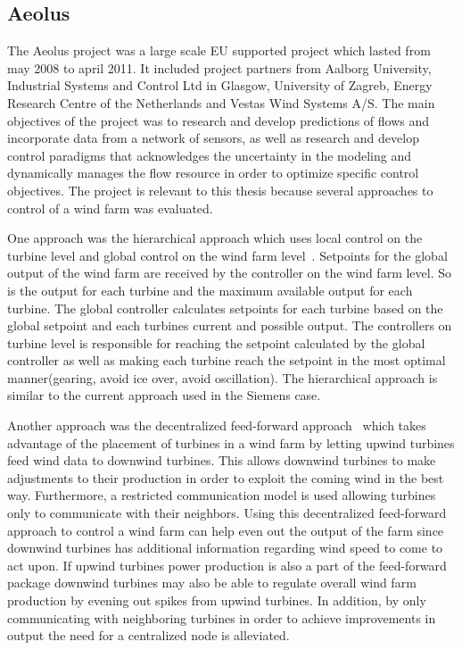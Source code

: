 \subsection{Aeolus}
The Aeolus project was a large scale EU supported project which lasted from may 2008 to april 2011. It included project partners from 
Aalborg University, Industrial Systems and Control Ltd in Glasgow, University of Zagreb, Energy Research Centre of the Netherlands and Vestas Wind Systems A/S.
The main objectives of the project was to research and develop predictions of flows and incorporate data from a network of sensors, as well as research and develop control paradigms that acknowledges the uncertainty in the modeling and dynamically manages the flow resource in order to optimize specific control objectives.
The project is relevant to this thesis because several approaches to control of a wind farm was evaluated.

One approach was the hierarchical approach which uses local control on the turbine level and global control on the wind farm level~\cite{HeirarchicalWindFarmControl}.
Setpoints for the global output of the wind farm are received by the controller on the wind farm level.
So is the output for each turbine and the maximum available output for each turbine.
The global controller calculates setpoints for each turbine based on the global setpoint and each turbines current and possible output.
The controllers on turbine level is responsible for reaching the setpoint calculated by the global controller as well as making each turbine reach the setpoint in the most optimal manner(gearing, avoid ice over, avoid oscillation).
The hierarchical approach is similar to the current approach used in the Siemens case.

Another approach was the decentralized feed-forward approach~\cite{DecentralisedFeedforwardControlOfWindFarms} which takes advantage of the placement of turbines in a wind farm by letting upwind turbines feed wind data to downwind turbines. 
This allows downwind turbines to make adjustments to their production in order to exploit the coming wind in the best way.
Furthermore, a restricted communication model is used allowing turbines only to communicate with their neighbors.
Using this decentralized feed-forward approach to control a wind farm can help even out the output of the farm since downwind turbines has additional information regarding wind speed to come to act upon. If upwind turbines power production is also a part of the feed-forward package downwind turbines may also be able to regulate overall wind farm production by evening out spikes from upwind turbines.
In addition, by only communicating with neighboring turbines in order to achieve improvements in output the need for a centralized node is alleviated.

